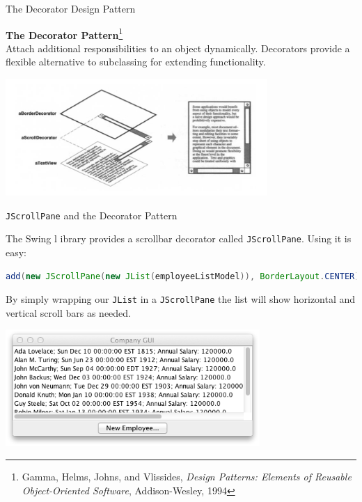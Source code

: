 \documentclass{beamer}
\begin{document}
\begin{frame}[fragile]{The Decorator Design Pattern}


{\bf The Decorator Pattern}\footnote{Gamma, Helms, Johns, and Vlissides, {\it Design Patterns: Elements of Reusable Object-Oriented Software}, Addison-Wesley, 1994}\\
Attach additional responsibilities to an object dynamically. Decorators provide a flexible alternative to subclassing for extending functionality.\\

\begin{center}
\includegraphics[height=1.75in]{gof-decorator-diagram.png}
\end{center}



\end{frame}

\begin{frame}[fragile]{{\tt JScrollPane} and the Decorator Pattern}


The Swing l ibrary provides a scrollbar decorator called {\tt JScrollPane}.  Using it is easy:
\begin{lstlisting}[language=Java]
add(new JScrollPane(new JList(employeeListModel)), BorderLayout.CENTER);
\end{lstlisting}
By simply wrapping our {\tt JList} in a {\tt JScrollPane} the list will show horizontal and vertical scroll bars as needed.

\begin{center}
\includegraphics[height=1.75in]{CompanyGui.png}
\end{center}


\end{frame}
\end{document}
